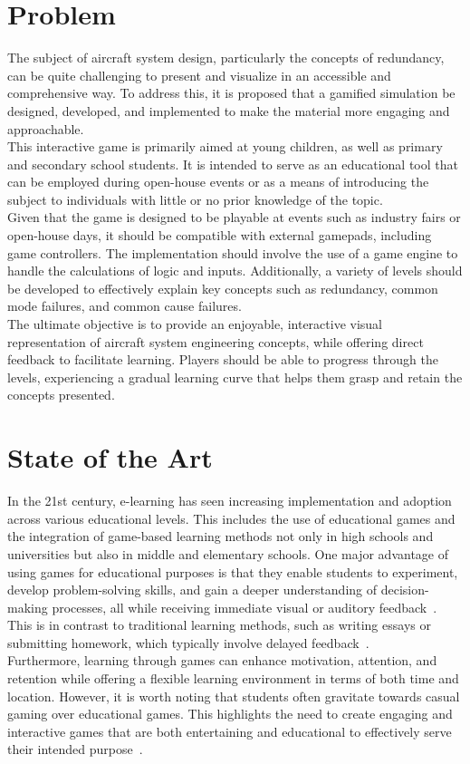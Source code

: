 \section{Problem}\label{sec:problem}
The subject of aircraft system design, particularly the concepts of redundancy, can be quite challenging to present and visualize
in an accessible and comprehensive way.
To address this, it is proposed that a gamified simulation be designed, developed, and implemented to make the material
more engaging and approachable.
\\
This interactive game is primarily aimed at young children, as well as primary and secondary school students.
It is intended to serve as an educational tool that can be employed during open-house events or as a means of
introducing the subject to individuals with little or no prior knowledge of the topic.
\\
Given that the game is designed to be playable at events such as industry fairs or open-house days,
it should be compatible with external gamepads, including game controllers.
The implementation should involve the use of a game engine to handle the calculations of logic and inputs.
Additionally, a variety of levels should be developed to effectively explain key concepts such as redundancy, common mode failures, and common cause failures.
\\
The ultimate objective is to provide an enjoyable, interactive visual representation of aircraft system engineering concepts,
while offering direct feedback to facilitate learning.
Players should be able to progress through the levels, experiencing a gradual learning curve that helps them grasp and
retain the concepts presented.

\section{State of the Art}\label{sec:state-of-the-art}
In the 21st century, e-learning has seen increasing implementation and adoption across various educational levels.
This includes the use of educational games and the integration of game-based learning methods not only in
high schools and universities but also in middle and elementary schools.
One major advantage of using games for educational purposes is that they enable students to experiment,
develop problem-solving skills, and gain a deeper understanding of decision-making processes,
all while receiving immediate visual or auditory feedback~\cite{application-of-education-games-to-enhance-student-learning}.
This is in contrast to traditional learning methods, such as writing essays or submitting homework,
which typically involve delayed feedback~\cite{more-than-just-fun-and-games}.
\\
Furthermore, learning through games can enhance motivation, attention, and retention while offering a flexible learning environment
in terms of both time and location.
However, it is worth noting that students often gravitate towards casual gaming over educational games.
This highlights the need to create engaging and interactive games that are both entertaining and educational to
effectively serve their intended purpose~\cite{WHITTON}.

